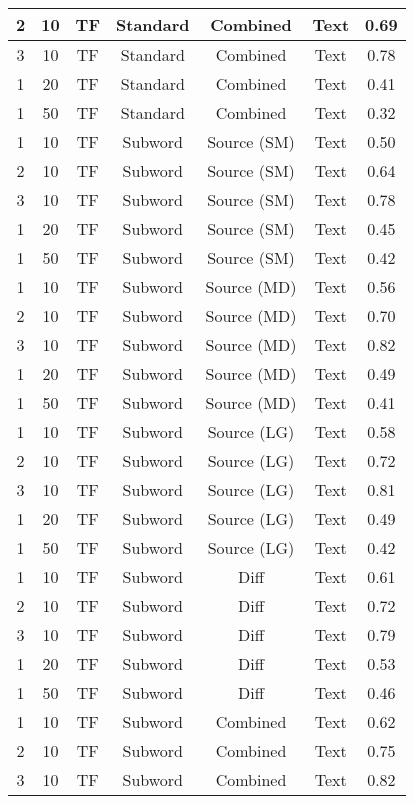 \begin{longtable}{|c|c|c|c|c|c|c|}
\hline
2 & 10 & TF & Standard & Combined & Text & 0.69 \\
\hline
3 & 10 & TF & Standard & Combined & Text & 0.78 \\
\hline
1 & 20 & TF & Standard & Combined & Text & 0.41 \\
\hline
1 & 50 & TF & Standard & Combined & Text & 0.32 \\
\hline
1 & 10 & TF & Subword & Source (SM) & Text & 0.50 \\
\hline
2 & 10 & TF & Subword & Source (SM) & Text & 0.64 \\
\hline
3 & 10 & TF & Subword & Source (SM) & Text & 0.78 \\
\hline
1 & 20 & TF & Subword & Source (SM) & Text & 0.45 \\
\hline
1 & 50 & TF & Subword & Source (SM) & Text & 0.42 \\
\hline
1 & 10 & TF & Subword & Source (MD) & Text & 0.56 \\
\hline
2 & 10 & TF & Subword & Source (MD) & Text & 0.70 \\
\hline
3 & 10 & TF & Subword & Source (MD) & Text & 0.82 \\
\hline
1 & 20 & TF & Subword & Source (MD) & Text & 0.49 \\
\hline
1 & 50 & TF & Subword & Source (MD) & Text & 0.41 \\
\hline
1 & 10 & TF & Subword & Source (LG) & Text & 0.58 \\
\hline
2 & 10 & TF & Subword & Source (LG) & Text & 0.72 \\
\hline
3 & 10 & TF & Subword & Source (LG) & Text & 0.81 \\
\hline
1 & 20 & TF & Subword & Source (LG) & Text & 0.49 \\
\hline
1 & 50 & TF & Subword & Source (LG) & Text & 0.42 \\
\hline
1 & 10 & TF & Subword & Diff & Text & 0.61 \\
\hline
2 & 10 & TF & Subword & Diff & Text & 0.72 \\
\hline
3 & 10 & TF & Subword & Diff & Text & 0.79 \\
\hline
1 & 20 & TF & Subword & Diff & Text & 0.53 \\
\hline
1 & 50 & TF & Subword & Diff & Text & 0.46 \\
\hline
1 & 10 & TF & Subword & Combined & Text & 0.62 \\
\hline
2 & 10 & TF & Subword & Combined & Text & 0.75 \\
\hline
3 & 10 & TF & Subword & Combined & Text & 0.82 \\

\end{longtable}
